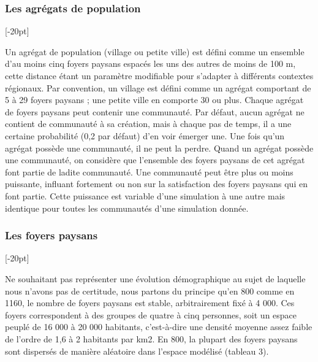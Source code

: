 \documentclass[12pt, a4paper, oneside]{book}
\begin{document}
	\subsubsection{Les agrégats de population}[-20pt]
	
	Un agrégat de population (village ou petite ville) est défini comme un ensemble d'au moins cinq foyers paysans espacés les uns des autres de moins de 100 m, cette distance étant un paramètre modifiable pour s'adapter à différents contextes régionaux.
	Par convention, un village est défini comme un agrégat comportant de 5 à 29 foyers paysans ; une petite ville en comporte 30 ou plus.
	Chaque agrégat de foyers paysans peut contenir une communauté.
	Par défaut, aucun agrégat ne contient de communauté à sa création, mais à chaque pas de temps, il a une certaine probabilité (0,2 par défaut) d'en voir émerger une.
	Une fois qu'un agrégat possède une communauté, il ne peut la perdre.
	Quand un agrégat possède une communauté, on considère que l'ensemble des foyers paysans de cet agrégat font partie de ladite communauté.
	Une communauté peut être plus ou moins puissante, influant fortement ou non sur la satisfaction des foyers paysans qui en font partie.
	Cette puissance est variable d'une simulation à une autre mais identique pour toutes les communautés d'une simulation donnée.
	
	
	\subsubsection{Les foyers paysans}[-20pt]

	Ne souhaitant pas représenter une évolution démographique au sujet de laquelle nous n'avons pas de certitude, nous partons du principe qu'en 800 comme en 1160, le nombre de foyers paysans est stable, arbitrairement fixé à 4 000.
	Ces foyers correspondent à des groupes de quatre à cinq personnes, soit un espace peuplé de 16 000 à 20 000 habitants, c'est-à-dire une densité moyenne assez faible de l'ordre de 1,6 à 2 habitants par km2.
	En 800, la plupart des foyers paysans sont dispersés de manière aléatoire dans l'espace modélisé (tableau 3).
	
\end{document}
